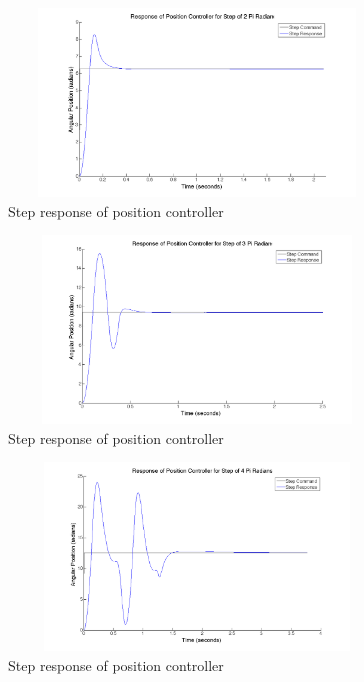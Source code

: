 \documentclass[letterpaper]{article}
\begin{document}
\begin{figure}[H]
\begin{center}
\includegraphics[width = 10cm, height = 5cm]{posstep_2pi.png}
\caption{Step response of position controller}
\label{q5_b3}
\end{center}
\end{figure}

\begin{figure}[H]
\begin{center}
\includegraphics[width = 10cm, height = 5cm]{posstep_3pi.png}
\caption{Step response of position controller}
\label{q5_b4}
\end{center}
\end{figure}

\begin{figure}[H]
\begin{center}
\includegraphics[width = 10cm, height = 5cm]{posstep_4pi.png}
\caption{Step response of position controller}
\label{q5_b5}
\end{center}
\end{figure}
\end{document}
